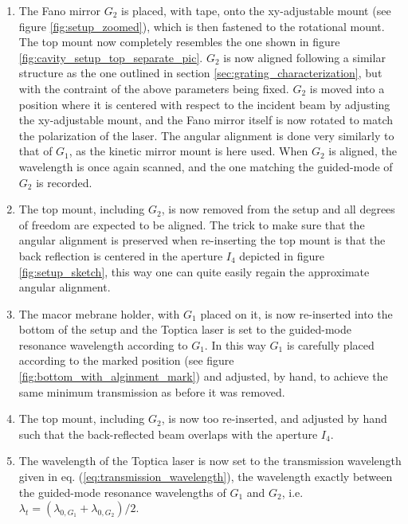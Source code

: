 \begin{enumerate}
    \item The Fano mirror $G_2$ is placed, with tape, onto the xy-adjustable mount (see figure \ref{fig:setup_zoomed}), which is then fastened to the rotational mount. The top mount now completely resembles the one shown in figure \ref{fig:cavity_setup_top_separate_pic}. $G_2$ is now aligned following a similar structure as the one outlined in section \ref{sec:grating_characterization}, but with the contraint of the above parameters being fixed. $G_2$ is moved into a position where it is centered with respect to the incident beam by adjusting the xy-adjustable mount, and the Fano mirror itself is now rotated to match the polarization of the laser. The angular alignment is done very similarly to that of $G_1$, as the kinetic mirror mount is here used. When $G_2$ is aligned, the wavelength is once again scanned, and the one matching the guided-mode of $G_2$ is recorded.
    \item The top mount, including $G_2$, is now removed from the setup and all degrees of freedom are expected to be aligned. The trick to make sure that the angular alignment is preserved when re-inserting the top mount is that the back reflection is centered in the aperture $I_4$ depicted in figure \ref{fig:setup_sketch}, this way one can quite easily regain the approximate angular alignment.
    \item The macor mebrane holder, with $G_1$ placed on it, is now re-inserted into the bottom of the setup and the Toptica laser is set to the guided-mode resonance wavelength according to $G_1$. In this way $G_1$ is carefully placed according to the marked position (see figure \ref{fig:bottom_with_alginment_mark}) and adjusted, by hand, to achieve the same minimum transmission as before it was removed. 
    \item The top mount, including $G_2$, is now too re-inserted, and adjusted by hand such that the back-reflected beam overlaps with the aperture $I_4$. 
    \item The wavelength of the Toptica laser is now set to the transmission wavelength given in eq. (\ref{eq:transmission_wavelength}), the wavelength exactly between the guided-mode resonance wavelengths of $G_1$ and $G_2$, i.e. $\lambda_t = (\lambda_{0,G_1} + \lambda_{0,G_2})/2$. 
\end{enumerate}

